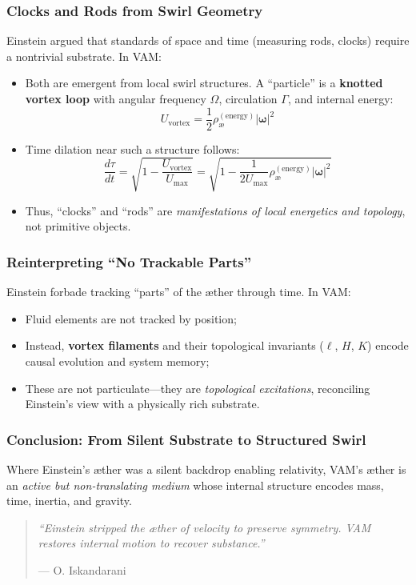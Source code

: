 \medskip

\subsubsection*{Clocks and Rods from Swirl Geometry}
Einstein argued that standards of space and time (measuring rods, clocks) require a nontrivial substrate. In VAM:
\begin{itemize}
    \item Both are emergent from local swirl structures. A “particle” is a \textbf{knotted vortex loop} with angular frequency \( \Omega \), circulation \( \Gamma \), and internal energy:
    \[
        U_{\text{vortex}} = \frac{1}{2} \rho_\text{\ae}^{(\text{energy})} |\boldsymbol{\omega}|^2
    \]
    \item Time dilation near such a structure follows:
    \[
        \frac{d\tau}{dt} = \sqrt{1 - \frac{U_{\text{vortex}}}{U_{\text{max}}}} = \sqrt{1 - \frac{1}{2U_{\text{max}}} \rho_\text{\ae}^{(\text{energy})} |\boldsymbol{\omega}|^2}
    \]
    \item Thus, “clocks” and “rods” are \emph{manifestations of local energetics and topology}, not primitive objects.
\end{itemize}

\medskip

\subsubsection*{Reinterpreting “No Trackable Parts”}
Einstein forbade tracking “parts” of the æther through time. In VAM:
\begin{itemize}
    \item Fluid elements are not tracked by position;
    \item Instead, \textbf{vortex filaments} and their topological invariants (\( \ell \), \( H \), \( K \)) encode causal evolution and system memory;
    \item These are not particulate—they are \emph{topological excitations}, reconciling Einstein’s view with a physically rich substrate.
\end{itemize}

\medskip

\subsubsection*{Conclusion: From Silent Substrate to Structured Swirl}
Where Einstein’s æther was a silent backdrop enabling relativity, VAM’s æther is an \emph{active but non-translating medium} whose internal structure encodes mass, time, inertia, and gravity.
\vspace{0.5em}


\begin{quote}
\textit{“Einstein stripped the æther of velocity to preserve symmetry. VAM restores internal motion to recover substance.”}
\begin{flushright}
— O. Iskandarani
\end{flushright}
\end{quote}